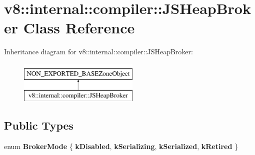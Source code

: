 \hypertarget{classv8_1_1internal_1_1compiler_1_1JSHeapBroker}{}\section{v8\+:\+:internal\+:\+:compiler\+:\+:J\+S\+Heap\+Broker Class Reference}
\label{classv8_1_1internal_1_1compiler_1_1JSHeapBroker}
Inheritance diagram for v8\+:\+:internal\+:\+:compiler\+:\+:J\+S\+Heap\+Broker\+:\begin{figure}[H]
\begin{center}
\leavevmode
\includegraphics[height=2.000000cm]{classv8_1_1internal_1_1compiler_1_1JSHeapBroker}
\end{center}
\end{figure}
\subsection*{Public Types}
\begin{DoxyCompactItemize}
\item 
\mbox{\label{classv8_1_1internal_1_1compiler_1_1JSHeapBroker_ac57beac71a436b2c1f6e145fa32363e4}} 
enum {\bfseries Broker\+Mode} \{ {\bfseries k\+Disabled}, 
{\bfseries k\+Serializing}, 
{\bfseries k\+Serialized}, 
{\bfseries k\+Retired}
 \}
\end{DoxyCompactItemize}

